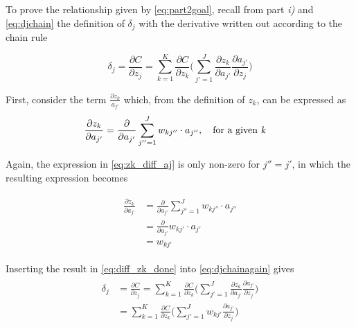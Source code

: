 \documentclass{article}
\begin{document}
To prove the relationship given by \eqref{eq:part2goal}, recall from part \textit{i)} and \eqref{eq:djchain} the definition of $\delta_j$ with the derivative written out according to the chain rule

\begin{equation}
        \delta_j = \frac{\partial C}{\partial z_j} = \sum_{k=1}^K \frac{\partial C}{\partial z_k} \bigg(\sum_{j'=1}^J\frac{\partial z_k}{\partial a_{j'}}\frac{\partial a_{j'}}{\partial z_j} \bigg)
    \label{eq:djchainagain}
\end{equation}

First, consider the term $\frac{\partial z_k}{a_{j'}}$ which, from the definition of $z_k$, can be expressed as
\begin{align}
\begin{split}
    \frac{\partial z_k}{\partial a_{j'}} &= \frac{\partial}{\partial a_{j'}} \sum_{j'' = 1}^J w_{kj''} \cdot a_{j''}, \quad \text{for a given \textit{k}}
\end{split}
\label{eq:zk_diff_aj}
\end{align}

Again, the expression in \eqref{eq:zk_diff_aj} is only non-zero for $j'' = j'$, in which the resulting expression becomes

\begin{align}
\begin{split}
    \frac{\partial z_k}{\partial a_{j'}} &= \frac{\partial}{\partial a_{j'}} \sum_{j'' = 1}^J w_{kj''} \cdot a_{j''} \\
    &=  \frac{\partial}{\partial a_{j'}} w_{kj'} \cdot a_{j'} \\
    &= w_{kj'}
\end{split}
\label{eq:diff_zk_done}
\end{align}

Inserting the result in \eqref{eq:diff_zk_done} into \eqref{eq:djchainagain} gives
\begin{align}
\begin{split}
        \delta_j &= \frac{\partial C}{\partial z_j} = \sum_{k=1}^K \frac{\partial C}{\partial z_k} \bigg(\sum_{j'=1}^J\frac{\partial z_k}{\partial a_{j'}}\frac{\partial a_{j'}}{\partial z_j} \bigg) \\
        &= \sum_{k=1}^K \frac{\partial C}{\partial z_k} \bigg(\sum_{j'=1}^J w_{kj'} \frac{\partial a_{j'}}{\partial z_j} \bigg)
\end{split}
\label{eq:dj_shorter}
\end{align}
\end{document}
